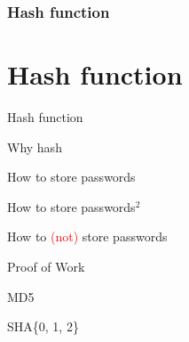 \section[Section]{Hash function}
\part{Hash function}

\begin{frame}{Hash function}

\end{frame}

\begin{frame}{Why hash}

\end{frame}

\begin{frame}{How to store passwords}

\end{frame}

\begin{frame}{How to store passwords$^2$}

\end{frame}

\begin{frame}{How to \textcolor{red}{(not)} store passwords}

\end{frame}

\begin{frame}{Proof of Work}

\end{frame}

\begin{frame}{MD5}

\end{frame}

\begin{frame}{SHA\{0, 1, 2\}}

\end{frame}

